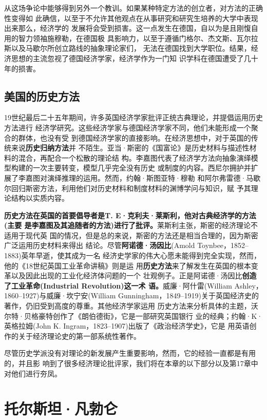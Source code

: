 从这场争论中能够得到另外一个教训。如果某种特定方法的创立者，对方法的正确性变得如
此确信，以至于不允许其他观点在从事研究和研究生培养的大学中表现出来那么，经济学的
发展将会受到损害。这一点发生在德国，自以为是且刚愎自用的智力领袖施穆勒，在德国极
具影响力，以至于遵循门格尔、杰文斯、瓦尔拉斯以及马歇尔所创立路线的抽象理论家们，
无法在德国找到大学职位。结果，经济思想的主流忽视了德国经济学家，经济学作为一门知
识学科在德国遭受了几十年的损害。

\subsection{美国的历史方法}

19世纪最后二十五年期间，许多英国经济学家批评正统古典理论，并提倡运用历史方法进行
经济学研究。这些经济学家与德国经济学家不同，他们未能形成一个聚合的群体，也没有受
到德国经济学家的直接影响。在经济思想中，对于英国的传统来说\textbf{历史归纳方法}并
不陌生。亚当·斯密的《国富论》是历史材料与描述性材料的混合，再配合一个松散的理论结
构。李嘉图代表了经济学方法向抽象演绎模型构建的一次主要转变，模型几乎完全没有历史
或制度的内容。西尼尔拥护并扩展了李嘉图对演绎推理的运用。然而，约翰·斯图亚特·穆勒
和阿尔弗雷德·马歇尔回归斯密方法，利用他们对历史材料和制度材料的渊博学问与知识，赋
予其理论结构以实质内容。

\textbf{历史方法在英国的首要倡导者是T. E·克利夫·莱斯利，他对古典经济学的方法(主要
  是李嘉图及其追随者的方法)进行了批评。}莱斯利主张，斯密的经济理论不适用于现代英
国的情况，但是总的来说，斯密的方法还是相当合理的，因为斯密广泛运用历史材料来得出
结论。尽管\textbf{阿诺德·汤因比}(Amold Toynbee，1852--1883)英年早逝，使其成为一名
经济史学家的伟大心愿未能得到完全实现，然而，他的《18世纪英国工业革命讲稿》则是运
用\textbf{历史方法}来了解发生在英国的根本变革以及因此出现的工业化经济体问题的一个
壮观例子。正是阿诺德·汤因比\textbf{创造了工业革命(Industrial Revolution)这一术
  语。}威廉·阿什雷(William Ashley，1860--1927)与威廉·坎宁安(William
Gunningham，1849--1919)关于英国经济史的著作，仍旧受到高度的尊重。其他经济学家运用
历史方法来分析具体的主题，沃尔特·贝格豪特创作了《朗伯德街》，它是一部研究英国银行
业的经典；约翰·K·英格拉姆(John K. Ingram，1823--1907)出版了《政治经济学史》，它是
用英语创作的关于经济理论史的第一部系统性著作。

尽管历史学派没有对理论的新发展产生重要影响，然而，它的经验一直都是有用的，并且影
响到了很多经济理论批评家，我们将在本章的以下部分以及第17章中对他们进行夯凤。

\section{托尔斯坦·凡勃仑}


